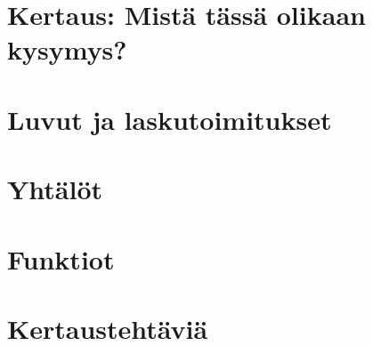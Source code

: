 
\chapter*{Kertaus: Mistä tässä olikaan kysymys?}
    
    

\chapter{Luvut ja laskutoimitukset}
    
    
    
    
    
    

\chapter{Yhtälöt}
    
    
    
    
    

\chapter{Funktiot}
    
    
    
    

\chapter{Kertaustehtäviä}
    
    
    
